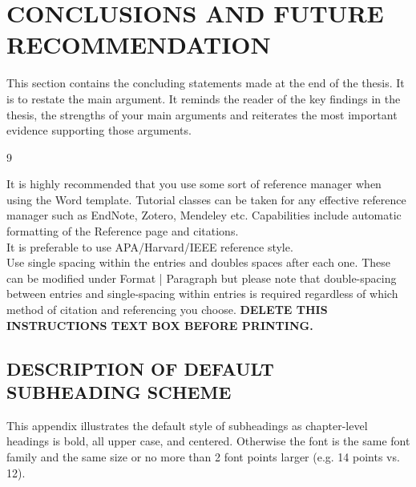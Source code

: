 \documentclass[a4paper,12pt,one side]{report}
\theoremstyle{definition}
\begin{document}
\begin{justify}
\chapter{CONCLUSIONS AND FUTURE RECOMMENDATION}
\noindent This section contains the concluding statements made at the end of the thesis. It is to restate the main argument. It reminds the reader of the key findings in the thesis, the strengths of your main arguments and reiterates the most important evidence supporting those arguments.\\
   \begin{thebibliography}{9}
		\end{thebibliography}
\begin{tcolorbox}[enhanced jigsaw,
    sharp corners,
    boxrule=0.5pt, 
    colback=blue!30!white,   
    borderline={0.5pt}{-2pt}{black,solid} %
 ]
 \begin{justify}
 It is highly recommended that you use some sort of reference manager when using the Word template. Tutorial classes can be taken for any effective reference manager such as EndNote, Zotero, Mendeley etc. Capabilities include automatic formatting of the Reference page and citations.\\
It is preferable to use APA/Harvard/IEEE reference style.\\
Use single spacing within the entries and doubles spaces after each one. These can be modified under Format | Paragraph but please note that double-spacing between entries and single-spacing within entries is required regardless of which method of citation and referencing you choose.\vspace{1cm}
\bf{DELETE THIS INSTRUCTIONS TEXT BOX BEFORE PRINTING.}
\end{justify}
\end{tcolorbox}
\begin{appendix}
    \begin{center}
\chapter {DESCRIPTION OF DEFAULT SUBHEADING SCHEME}
\end{center}
This appendix illustrates the default style of subheadings as chapter-level headings is bold, all upper case, and centered. Otherwise the font is the same font family and the same size or no more than 2 font points larger (e.g. 14 points vs. 12).

\end{appendix}
\end{justify}
\end{document}
